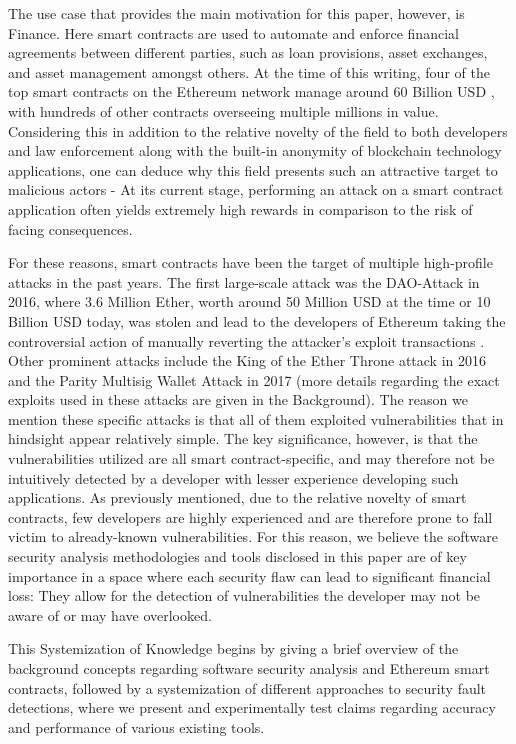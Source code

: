 \documentclass[letterpaper,twocolumn,10pt]{article}
\begin{document}
The use case that provides the main motivation for this paper, however, is Finance. Here smart contracts are used to automate and enforce financial agreements between different parties, such as loan provisions, asset exchanges, and asset management amongst others. At the time of this writing, four of the top smart contracts on the Ethereum network manage around 60 Billion USD \cite{nr1} \cite{nr2} \cite{nr1T} \cite{nr2T}, with hundreds of other contracts overseeing multiple millions in value. Considering this in addition to the relative novelty of the field to both developers and law enforcement along with the built-in anonymity of blockchain technology applications, one can deduce why this field presents such an attractive target to malicious actors - At its current stage, performing an attack on a smart contract application often yields extremely high rewards in comparison to the risk of facing consequences. 

For these reasons, smart contracts have been the target of multiple high-profile attacks in the past years. The first large-scale attack was the DAO-Attack in 2016, where 3.6 Million Ether, worth around 50 Million USD at the time or 10 Billion USD today,  was stolen and lead to the developers of Ethereum taking the controversial action of manually reverting the attacker's exploit transactions \cite{atzei_bartoletti_cimoli_2017}. Other prominent attacks include the King of the Ether Throne attack in 2016 and the Parity Multisig Wallet Attack in 2017 \cite{atzei_bartoletti_cimoli_2017}(more details regarding the exact exploits used in these attacks are given in the Background). The reason we mention these specific attacks is that all of them exploited vulnerabilities that in hindsight appear relatively simple. The key significance, however, is that the vulnerabilities utilized are all smart contract-specific, and may therefore not be intuitively detected by a developer with lesser experience developing such applications. As previously mentioned, due to the relative novelty of smart contracts, few developers are highly experienced and are therefore prone to fall victim to already-known vulnerabilities. For this reason, we believe the software security analysis methodologies and tools disclosed in this paper are of key importance in a space where each security flaw can lead to significant financial loss: They allow for the detection of vulnerabilities the developer may not be aware of or may have overlooked. 

This Systemization of Knowledge begins by giving a brief overview of the background concepts regarding software security analysis and Ethereum smart contracts, followed by a systemization of different approaches to security fault detections, where we present and experimentally test claims regarding accuracy and performance of various existing tools. 
\end{document}
